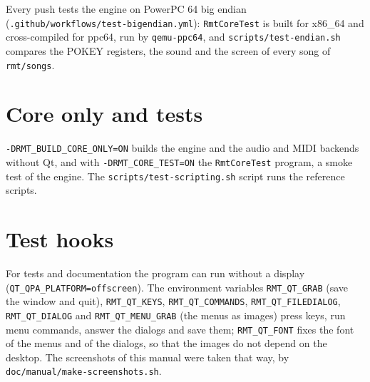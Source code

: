 Every push tests the engine on PowerPC 64 big endian (\texttt{.github/\allowbreak workflows/\allowbreak test-\allowbreak bigendian.yml}):
\texttt{RmtCoreTest} is built for x86\_64 and cross-compiled for ppc64, run by \texttt{qemu-ppc64}, and
\texttt{scripts/test-endian.sh} compares the POKEY registers, the sound and the screen of every song of \texttt{rmt/songs}.

\section{Core only and tests}

\texttt{-DRMT\_BUILD\_CORE\_ONLY=ON} builds the engine and the audio and MIDI backends without Qt, and with \texttt{-DRMT\_CORE\_TEST=ON}
the \texttt{RmtCoreTest} program, a smoke test of the engine. The \texttt{scripts/test-scripting.sh} script runs the reference scripts.

\section{Test hooks}

For tests and documentation the program can run without a display (\texttt{QT\_QPA\_PLATFORM=offscreen}). The environment variables
\texttt{RMT\_QT\_GRAB} (save the window and quit), \texttt{RMT\_QT\_KEYS}, \texttt{RMT\_QT\_COMMANDS}, \texttt{RMT\_QT\_FILEDIALOG},
\texttt{RMT\_QT\_DIALOG} and \texttt{RMT\_QT\_MENU\_GRAB} (the menus as images) press keys, run menu commands, answer the dialogs and save them;
\texttt{RMT\_QT\_FONT} fixes the font of the menus and of the dialogs, so that the images do not depend on the desktop. The
screenshots of this manual were taken that way, by \texttt{doc/manual/make-screenshots.sh}.
